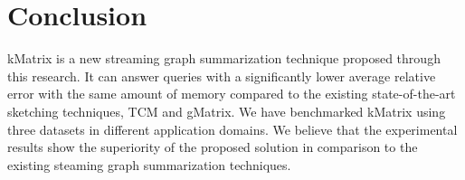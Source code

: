 \section{Conclusion}

kMatrix is a new streaming graph summarization technique proposed through this research. It can answer queries with a significantly lower average relative error with the same amount of memory compared to the existing state-of-the-art sketching techniques, TCM and gMatrix. We have benchmarked kMatrix using three datasets in different application domains. We believe that the experimental results show the superiority of the proposed solution in comparison to the existing steaming graph summarization techniques. 